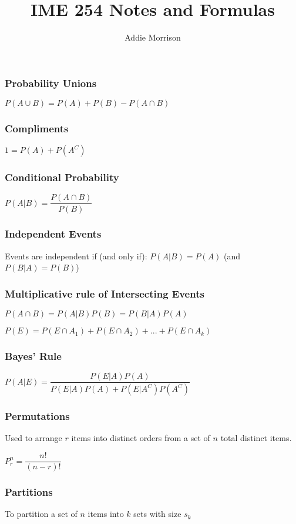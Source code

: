 \documentclass{hitec}
\author{Addie Morrison}
\title{IME 254 Notes and Formulas}
\begin{document}
\maketitle
\subsubsection*{Probability Unions}
$P(A\cup B) = P(A) +P(B)-P(A\cap B)$

\subsubsection*{Compliments}
$1 = P(A)+P(A^C)$

\subsubsection*{Conditional Probability}
$P(A|B) = \dfrac{P(A\cap B)}{P(B)}$

\subsubsection*{Independent Events}
Events are independent if (and only if): $P(A|B) = P(A)$ (and $P(B|A) = P(B)$)

\subsubsection*{Multiplicative rule of Intersecting Events}
$P(A\cap B) =P(A|B)P(B) = P(B|A)P(A)$

$P(E) = P(E\cap A_1)+P(E\cap A_2)+...+P(E\cap A_k)$

\subsubsection*{Bayes' Rule}
$P(A|E) = \dfrac{P(E|A)P(A)}{P(E|A)P(A)+P(E|A^C)P(A^C)}$

\subsubsection*{Permutations}
Used to arrange $r$ items into distinct orders from a set of $n$ total distinct items.

$P^n_r = \dfrac{n!}{(n-r)!}$

\subsubsection*{Partitions}
To partition a set of $n$ items into $k$ sets with size $s_k$
\end{document}
